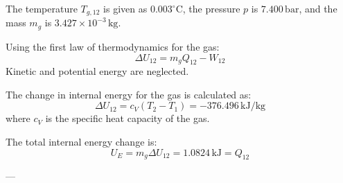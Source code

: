 The temperature \( T_{g,12} \) is given as \( 0.003^\circ\text{C} \), the pressure \( p \) is \( 7.400 \, \text{bar} \), and the mass \( m_g \) is \( 3.427 \times 10^{-3} \, \text{kg} \).  

Using the first law of thermodynamics for the gas:  
\[
\Delta U_{12} = m_g Q_{12} - W_{12}
\]  
Kinetic and potential energy are neglected.  

The change in internal energy for the gas is calculated as:  
\[
\Delta U_{12} = c_V (T_2 - T_1) = -376.496 \, \text{kJ/kg}
\]  
where \( c_V \) is the specific heat capacity of the gas.  

The total internal energy change is:  
\[
U_E = m_g \Delta U_{12} = 1.0824 \, \text{kJ} = Q_{12}
\]  

---